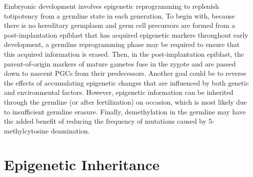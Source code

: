 \documentclass[12pt,twoside]{reedthesis}
\begin{document}
Embryonic development involves epigenetic reprogramming to replenish
totipotency from a germline state in each generation. To begin with,
because there is no hereditary germplasm and germ cell precursors are
formed from a post-implantation epiblast that has acquired epigenetic
markers throughout early development, a germline reprogramming phase may
be required to ensure that this acquired information is erased. Then, in
the post-implantation epiblast, the parent-of-origin markers of mature
gametes fuse in the zygote and are passed down to nascent PGCs from
their predecessors. Another goal could be to reverse the effects of
accumulating epigenetic changes that are influenced by both genetic and
environmental factors. However, epigenetic information can be inherited
through the germline (or after fertilization) on occasion, which is most
likely due to insufficient germline erasure. Finally, demethylation in
the germline may have the added benefit of reducing the frequency of
mutations caused by 5-methylcytosine deamination.

\hypertarget{epigenetic-inheritance}{%
\section*{Epigenetic Inheritance}\label{epigenetic-inheritance}}
\end{document}
